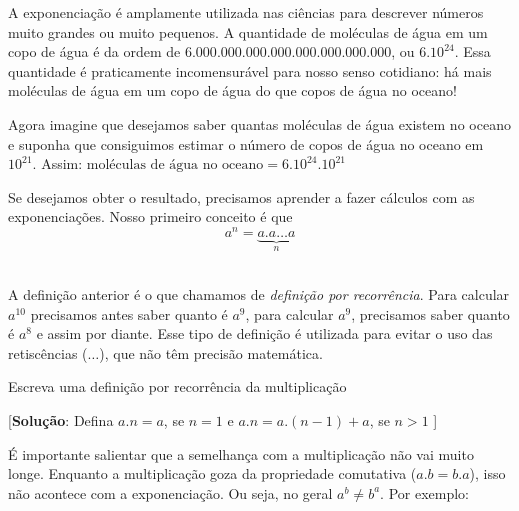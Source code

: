 A exponenciação é amplamente utilizada nas ciências para descrever números muito grandes ou muito pequenos. A quantidade de moléculas de água em um copo de água é da ordem de $6.000.000.000.000.000.000.000.000$, ou $6.10^{24}$. Essa quantidade é praticamente incomensurável para nosso senso cotidiano: há mais moléculas de água em um copo de água do que copos de água no oceano!

Agora imagine que desejamos saber quantas moléculas de água existem no oceano e suponha que consiguimos estimar o número de copos de água no oceano em $10^{21}$. Assim: $\text{moléculas de água no oceano} = 6.10^{24} . 10^{21}$

Se desejamos obter o resultado, precisamos aprender a fazer cálculos com as exponenciações. Nosso primeiro conceito é que 
$$a^n = \underbrace{a.a\ldots a}_{n}$$

\label{def:exp_natural}\\

A definição anterior é o que chamamos de \textit{definição por recorrência}. Para calcular $a^{10}$ precisamos antes saber quanto é $a^9$, para calcular $a^9$, precisamos saber quanto é $a^8$ e assim por diante. Esse tipo de definição é utilizada para evitar o uso das retiscências ($\ldots$), que não têm precisão matemática.
\begin{inlinexer}
Escreva uma definição por recorrência da multiplicação
\begin{flushright}
\tiny[\textbf{Solução}: Defina $a.n=a$, se $n=1$ e $a.n = a.(n-1) + a$, se $n>1$ ]
\end{flushright}
\end{inlinexer}
É importante salientar que a semelhança com a multiplicação não vai muito longe. Enquanto a multiplicação goza da propriedade comutativa ($a.b=b.a$), isso não acontece com a exponenciação. Ou seja, no geral $a^b \ne b^a$. Por exemplo:
\newpage
\comecaexer
